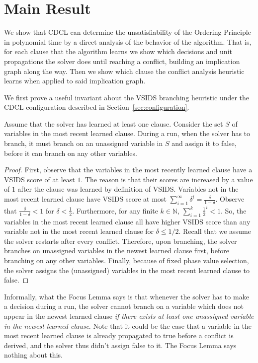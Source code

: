\documentclass[a4paper,UKenglish,cleveref, autoref, thm-restate]{lipics-v2021}
\begin{document}
\section{Main Result}
\label{sec:main}
We show that CDCL can determine the unsatisfiability of the Ordering Principle in polynomial time by a direct analysis of the behavior of the algorithm. That is, for each clause that the algorithm learns we show which decisions and unit propagations the solver does until reaching a conflict, building an implication graph along the way. Then we show which clause the conflict analysis heuristic learns when applied to said implication graph.

We first prove a useful invariant about the VSIDS branching heuristic under the CDCL configuration described in Section~\ref{sec:configuration}.

\begin{lemma}
Assume that the solver has learned at least one clause. Consider the set $S$ of variables in the most recent learned clause. During a run, when the solver has to branch, it must branch on an unassigned variable in $S$ and assign it to false, before it can branch on any other variables.
\end{lemma}

\begin{proof}
First, observe that the variables in the most recently learned clause have a VSIDS score of at least $1$. The reason is that their scores are increased by a value of $1$ after the clause was learned by definition of VSIDS. Variables not in the most recent learned clause have VSIDS score at most $\sum_{i = 1}^\infty \delta^i = \frac{\delta}{1 - \delta}$. Observe that $\frac{\delta}{1 - \delta} < 1$ for $\delta < \frac{1}{2}$. Furthermore, for any finite $k \in \mathbb{N}$, $\sum_{i = 1}^k \frac{1}{2}^i < 1$. So, the variables in the most recent learned clause all have higher VSIDS score than any variable not in the most recent learned clause for $\delta \leq 1/2$. Recall that we assume the solver restarts after every conflict. Therefore, upon branching, the solver branches on unassigned variables in the newest learned clause first, before branching on any other variables. Finally, because of fixed phase value selection, the solver assigns the (unassigned) variables in the most recent learned clause to false.
\end{proof}

Informally, what the Focus Lemma says is that whenever the solver has to make a decision during a run, the solver cannot branch on a variable which does not appear in the newest learned clause \textit{if there exists at least one unassigned variable in the newest learned clause}. Note that it could be the case that a variable in the most recent learned clause is already propagated to true before a conflict is derived, and the solver thus didn't assign false to it. The Focus Lemma says nothing about this.
\end{document}
